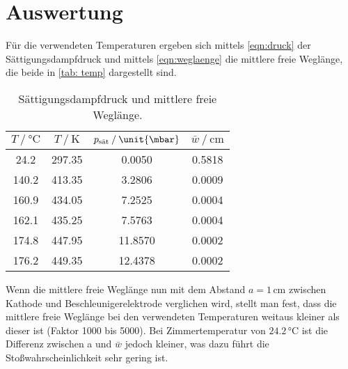 \section{Auswertung}
\label{sec:Auswertung}




Für die verwendeten Temperaturen ergeben sich mittels \autoref{eqn:druck} der Sättigungsdampfdruck und mittels \autoref{eqn:weglaenge} die mittlere 
freie Weglänge, die beide in \autoref{tab: temp} dargestellt sind.
\begin{table}
    \centering
    \caption{Sättigungsdampfdruck und mittlere freie Weglänge.}
\begin{tabular}{c c c c}
    \toprule
        $T\mathbin{/}\unit{\celsius}$ &$T\mathbin{/}\unit{\kelvin}$ & $p_{\text{sät}}\mathbin{/}\unit{\mbar}$ & $\bar{w} \mathbin{/} \unit{\cm}$ \\
    \midrule
    24.2 & 297.35 & 0.0050 & 0.5818\\
    140.2 & 413.35 & 3.2806 & 0.0009\\
    160.9 & 434.05 & 7.2525 & 0.0004\\
    162.1 & 435.25 & 7.5763 & 0.0004\\
    174.8 & 447.95 & 11.8570 & 0.0002 \\
    176.2 & 449.35 & 12.4378 & 0.0002 \\
     \bottomrule
    \end{tabular}
    \label{tab: temp}
\end{table}

Wenn die mittlere freie Weglänge nun mit dem Abstand $a=1\,\unit{\cm}$ zwischen Kathode und Beschleunigerelektrode verglichen wird, stellt man fest, dass die
mittlere freie Weglänge bei den verwendeten Temperaturen weitaus kleiner als dieser ist (Faktor 1000 bis 5000). Bei Zimmertemperatur von $24.2\,\unit{\celsius}$ ist die Differenz
zwischen a und $\bar{w}$ jedoch kleiner, was dazu führt die Stoßwahrscheinlichkeit sehr gering ist.

